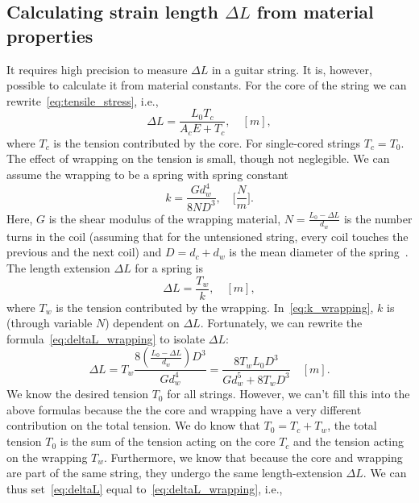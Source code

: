 \documentclass{article}
\begin{document}
\begin{sloppy}
\subsection{Calculating strain length $\Delta L$ from material properties}
%
It requires high precision to measure $\Delta L$ in a guitar string. It is, however, possible to calculate it from material constants. For the core of the string we can rewrite~\eqref{eq:tensile_stress}, i.e.,
%
\begin{equation}\label{eq:deltaL}
    \Delta L= \frac{L_0T_c}{A_cE + T_c}, \quad  [m], 
\end{equation}
%
where $T_c$ is the tension contributed by the core. For single-cored strings $T_c = T_0$.
%
The effect of wrapping on the tension is small, though not neglegible. We can assume the wrapping to be a spring with spring constant~\cite{childs:mechanical_engineering}
%
\begin{equation}\label{eq:k_wrapping}
    k = \frac{Gd_w^4}{8ND^3}, \quad \bigg[\frac{N}{m}\bigg]. 
\end{equation}
%
Here, $G$ is the shear modulus of the wrapping material, $N = \frac{L_0 - \Delta L}{d_w}$ is the number turns in the coil (assuming that for the untensioned string, every coil touches the previous and the next coil) and $D = d_c+d_w$ is the mean diameter of the spring~\cite{kemp:wound_and_unwound_strings}.
%
The length extension $\Delta L$ for a spring is
%
\begin{equation}\label{eq:deltaL_wrapping}
    \Delta L = \frac{T_w}{k}, \quad [m],
\end{equation}
%
where $T_w$ is the tension contributed by the wrapping. In~\eqref{eq:k_wrapping}, $k$ is (through variable $N$) dependent on $\Delta L$. Fortunately, we can rewrite the formula~\eqref{eq:deltaL_wrapping} to isolate $\Delta L$:
%
\begin{equation}
    \Delta L = T_w\frac{8(\frac{L_0 - \Delta L}{d_w})D^3}{Gd_w^4} = \frac{8T_wL_0D^3}{Gd_w^5 + 8T_wD^3} \quad [m].
\end{equation}
%
We know the desired tension $T_0$ for all strings. However, we can't fill this into the above formulas because the  the core and wrapping have a very different contribution on the total tension. We do know that $T_0 = T_c + T_w$, the total tension $T_0$ is the sum of the tension acting on the core $T_c$ and the tension acting on the wrapping $T_w$. Furthermore, we know that because the core and wrapping are part of the same string, they undergo the same length-extension $\Delta L$. We can thus set~\eqref{eq:deltaL} equal to~\eqref{eq:deltaL_wrapping}, i.e., 

\end{sloppy}
\end{document}
